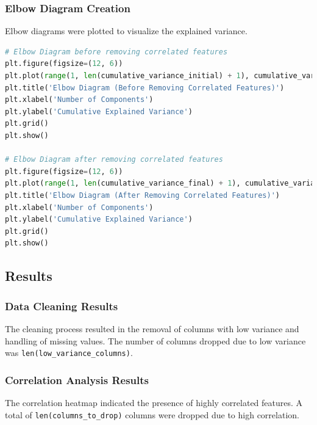 \subsubsection{Elbow Diagram Creation}
Elbow diagrams were plotted to visualize the explained variance.

\begin{lstlisting}[language=Python]
# Elbow Diagram before removing correlated features
plt.figure(figsize=(12, 6))
plt.plot(range(1, len(cumulative_variance_initial) + 1), cumulative_variance_initial, marker='o')
plt.title('Elbow Diagram (Before Removing Correlated Features)')
plt.xlabel('Number of Components')
plt.ylabel('Cumulative Explained Variance')
plt.grid()
plt.show()

# Elbow Diagram after removing correlated features
plt.figure(figsize=(12, 6))
plt.plot(range(1, len(cumulative_variance_final) + 1), cumulative_variance_final, marker='o', color='orange')
plt.title('Elbow Diagram (After Removing Correlated Features)')
plt.xlabel('Number of Components')
plt.ylabel('Cumulative Explained Variance')
plt.grid()
plt.show()
\end{lstlisting}

\subsection{Results}

\subsubsection{Data Cleaning Results}
The cleaning process resulted in the removal of columns with low variance and handling of missing values. The number of columns dropped due to low variance was \texttt{len(low\_variance\_columns)}.

\subsubsection{Correlation Analysis Results}
The correlation heatmap indicated the presence of highly correlated features. A total of \texttt{len(columns\_to\_drop)} columns were dropped due to high correlation.


